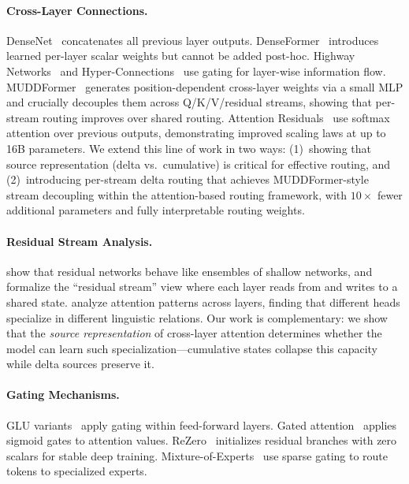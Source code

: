 \documentclass{article}
\begin{document}
\paragraph{Cross-Layer Connections.} DenseNet~\citep{huang2017densely} concatenates all previous layer outputs. DenseFormer~\citep{pagliardini2024denseformer} introduces learned per-layer scalar weights but cannot be added post-hoc. Highway Networks~\citep{srivastava2015highway} and Hyper-Connections~\citep{zhu2024hyperconnections} use gating for layer-wise information flow. MUDDFormer~\citep{wang2024muddformer} generates position-dependent cross-layer weights via a small MLP and crucially decouples them across Q/K/V/residual streams, showing that per-stream routing improves over shared routing. Attention Residuals~\citep{kimi2025attention} use softmax attention over previous outputs, demonstrating improved scaling laws at up to 16B parameters. We extend this line of work in two ways: (1)~showing that source representation (delta vs.\ cumulative) is critical for effective routing, and (2)~introducing per-stream delta routing that achieves MUDDFormer-style stream decoupling within the attention-based routing framework, with $10\times$ fewer additional parameters and fully interpretable routing weights.

\paragraph{Residual Stream Analysis.} \citet{veit2016residual} show that residual networks behave like ensembles of shallow networks, and \citet{elhage2021mathematical} formalize the ``residual stream'' view where each layer reads from and writes to a shared state. \citet{clark2019bert} analyze attention patterns across layers, finding that different heads specialize in different linguistic relations. Our work is complementary: we show that the \emph{source representation} of cross-layer attention determines whether the model can learn such specialization---cumulative states collapse this capacity while delta sources preserve it.

\paragraph{Gating Mechanisms.} GLU variants~\citep{shazeer2020glu} apply gating within feed-forward layers. Gated attention~\citep{qiu2025gated} applies sigmoid gates to attention values. ReZero~\citep{bachlechner2020rezero} initializes residual branches with zero scalars for stable deep training. Mixture-of-Experts~\citep{shazeer2017moe,fedus2022switch} use sparse gating to route tokens to specialized experts.
\end{document}
